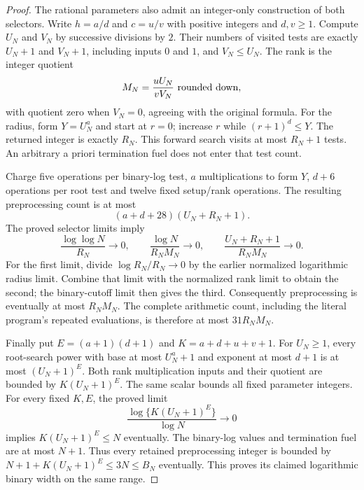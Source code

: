 \documentclass[11pt]{article}
\theoremstyle{definition}
\begin{document}
\begin{proof}
The rational parameters also admit an integer-only construction of both
selectors. Write $h=a/d$ and $c=u/v$ with positive integers and
$d,v\ge1$. Compute $U_N$ and $V_N$ by successive divisions by $2$.
Their numbers of visited tests are exactly $U_N+1$ and $V_N+1$,
including inputs $0$ and $1$, and $V_N\le U_N$.
The rank is the integer quotient
\[
 M_N=\frac{uU_N}{vV_N}\ \hbox{rounded down},
\]
with quotient zero when $V_N=0$, agreeing with the original formula.
For the radius, form $Y=U_N^a$ and start at $r=0$; increase $r$
while $(r+1)^d\le Y$. The returned integer is exactly $R_N$.
This forward search visits at most $R_N+1$ tests.
An arbitrary a priori termination fuel does not enter that test count.

Charge five operations per binary-log test, $a$ multiplications to
form $Y$, $d+6$ operations per root test and twelve fixed setup/rank
operations. The resulting preprocessing count is at most
\[
 (a+d+28)(U_N+R_N+1).
\]
The proved selector limits imply
\[
 \frac{\log\log N}{R_N}\longrightarrow0,\qquad
 \frac{\log N}{R_NM_N}\longrightarrow0,\qquad
 \frac{U_N+R_N+1}{R_NM_N}\longrightarrow0.
\]
For the first limit, divide $\log R_N/R_N\to0$ by the earlier
normalized logarithmic radius limit. Combine that limit with the
normalized rank limit to obtain the second; the binary-cutoff limit
then gives the third.
Consequently preprocessing is eventually at most $R_NM_N$.
The complete arithmetic count, including the literal program's
repeated evaluations, is therefore at most $31R_NM_N$.

Finally put $E=(a+1)(d+1)$ and $K=a+d+u+v+1$.
For $U_N\ge1$, every root-search power with base at most $U_N^a+1$
and exponent at most $d+1$ is at most $(U_N+1)^E$.
Both rank multiplication inputs and their quotient are bounded by
$K(U_N+1)^E$. The same scalar bounds all fixed parameter integers.
For every fixed $K,E$, the proved limit
\[
 \frac{\log\{K(U_N+1)^E\}}{\log N}\longrightarrow0
\]
implies $K(U_N+1)^E\le N$ eventually.
The binary-log values and termination fuel are at most $N+1$.
Thus every retained preprocessing integer is bounded by
$N+1+K(U_N+1)^E\le3N\le B_N$ eventually.
This proves its claimed logarithmic binary width on the same range.
\end{proof}
\end{document}
